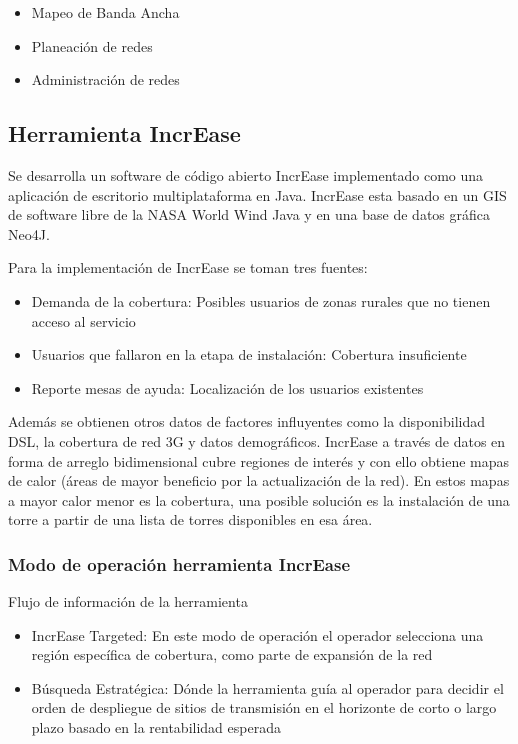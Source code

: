 \documentclass[]{article}
\providecommand{\tightlist}{%
  \setlength{\itemsep}{0pt}\setlength{\parskip}{0pt}}
\begin{document}
\begin{itemize}
\tightlist
\item
  Mapeo de Banda Ancha
\item
  Planeación de redes
\item
  Administración de redes
\end{itemize}

\subsection{Herramienta IncrEase}\label{herramienta-increase}

Se desarrolla un software de código abierto IncrEase implementado como
una aplicación de escritorio multiplataforma en Java. IncrEase esta
basado en un GIS de software libre de la NASA World Wind Java y en una
base de datos gráfica Neo4J.

Para la implementación de IncrEase se toman tres fuentes:

\begin{itemize}
\tightlist
\item
  Demanda de la cobertura: Posibles usuarios de zonas rurales que no
  tienen acceso al servicio
\item
  Usuarios que fallaron en la etapa de instalación: Cobertura
  insuficiente
\item
  Reporte mesas de ayuda: Localización de los usuarios existentes
\end{itemize}

Además se obtienen otros datos de factores influyentes como la
disponibilidad DSL, la cobertura de red 3G y datos demográficos.
IncrEase a través de datos en forma de arreglo bidimensional cubre
regiones de interés y con ello obtiene mapas de calor (áreas de mayor
beneficio por la actualización de la red). En estos mapas a mayor calor
menor es la cobertura, una posible solución es la instalación de una
torre a partir de una lista de torres disponibles en esa área.

\subsubsection{Modo de operación herramienta
IncrEase}\label{modo-de-operaciuxf3n-herramienta-increase}

Flujo de información de la herramienta

\begin{itemize}
\item
  IncrEase Targeted: En este modo de operación el operador selecciona
  una región específica de cobertura, como parte de expansión de la red
\item
  Búsqueda Estratégica: Dónde la herramienta guía al operador para
  decidir el orden de despliegue de sitios de transmisión en el
  horizonte de corto o largo plazo basado en la rentabilidad esperada
\end{itemize}
\end{document}
